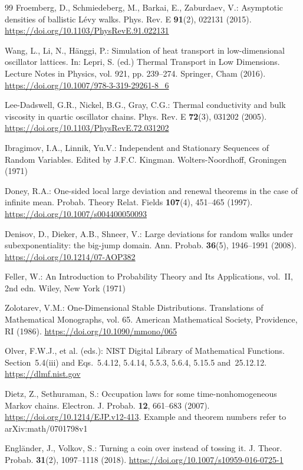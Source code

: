 \documentclass[11pt]{article}
\theoremstyle{definition}
\theoremstyle{remark}
\begin{document}
\begin{thebibliography}{99}
Froemberg, D., Schmiedeberg, M., Barkai, E., Zaburdaev, V.: Asymptotic
densities of ballistic L\'evy walks. Phys. Rev. E \textbf{91}(2), 022131
(2015). \url{https://doi.org/10.1103/PhysRevE.91.022131}

Wang, L., Li, N., H\"anggi, P.: Simulation of heat transport in
low-dimensional oscillator lattices. In: Lepri, S. (ed.) Thermal Transport in
Low Dimensions. Lecture Notes in Physics, vol. 921, pp. 239--274. Springer,
Cham (2016). \url{https://doi.org/10.1007/978-3-319-29261-8_6}

Lee-Dadswell, G.R., Nickel, B.G., Gray, C.G.: Thermal conductivity and bulk
viscosity in quartic oscillator chains. Phys. Rev. E \textbf{72}(3), 031202
(2005). \url{https://doi.org/10.1103/PhysRevE.72.031202}

Ibragimov, I.A., Linnik, Yu.V.: Independent and Stationary Sequences of
Random Variables. Edited by J.F.C. Kingman. Wolters-Noordhoff, Groningen
(1971)

Doney, R.A.: One-sided local large deviation and renewal theorems in the case
of infinite mean. Probab. Theory Relat. Fields \textbf{107}(4), 451--465
(1997). \url{https://doi.org/10.1007/s004400050093}

Denisov, D., Dieker, A.B., Shneer, V.: Large deviations for random walks under
subexponentiality: the big-jump domain. Ann. Probab. \textbf{36}(5),
1946--1991 (2008). \url{https://doi.org/10.1214/07-AOP382}

Feller, W.: An Introduction to Probability Theory and Its Applications,
vol.~II, 2nd edn. Wiley, New York (1971)

Zolotarev, V.M.: One-Dimensional Stable Distributions. Translations of
Mathematical Monographs, vol. 65. American Mathematical Society, Providence,
RI (1986). \url{https://doi.org/10.1090/mmono/065}

Olver, F.W.J., et al. (eds.): NIST Digital Library of Mathematical Functions.
Section~5.4(iii) and Eqs.~5.4.12, 5.4.14, 5.5.3, 5.6.4, 5.15.5 and~25.12.12.
\url{https://dlmf.nist.gov}

Dietz, Z., Sethuraman, S.: Occupation laws for some time-nonhomogeneous
Markov chains. Electron. J. Probab. \textbf{12}, 661--683 (2007).
\url{https://doi.org/10.1214/EJP.v12-413}. Example and theorem numbers refer
to arXiv:math/0701798v1

Engl\"ander, J., Volkov, S.: Turning a coin over instead of tossing it. J.
Theor. Probab. \textbf{31}(2), 1097--1118 (2018).
\url{https://doi.org/10.1007/s10959-016-0725-1}


\end{thebibliography}
\end{document}
